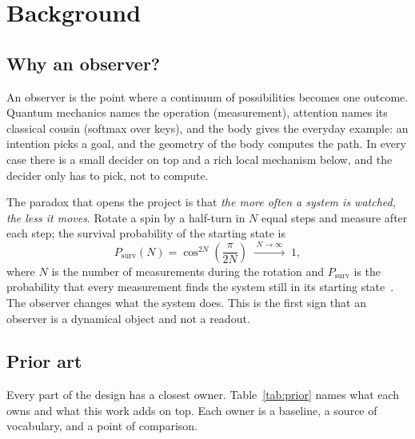 \section{Background}\label{sec:background}

\subsection{Why an observer?}

An observer is the point where a continuum of possibilities becomes one outcome. Quantum mechanics names the operation (measurement), attention names its classical cousin (softmax over keys), and the body gives the everyday example: an intention picks a goal, and the geometry of the body computes the path. In every case there is a small decider on top and a rich local mechanism below, and the decider only has to pick, not to compute.

The paradox that opens the project is that \emph{the more often a system is watched, the less it moves}. Rotate a spin by a half-turn in $N$ equal steps and measure after each step; the survival probability of the starting state is
\begin{equation}\label{eq:zeno}
  P_{\mathrm{surv}}(N)=\cos^{2N}\!\left(\frac{\pi}{2N}\right)\;\xrightarrow{\;N\to\infty\;}\;1,
\end{equation}
where $N$ is the number of measurements during the rotation and $P_{\mathrm{surv}}$ is the probability that every measurement finds the system still in its starting state~\cite{misra1977zeno}. The observer changes what the system does. This is the first sign that an observer is a dynamical object and not a readout.

\subsection{Prior art}

Every part of the design has a closest owner. Table~\ref{tab:prior} names what each owns and what this work adds on top. Each owner is a baseline, a source of vocabulary, and a point of comparison.

